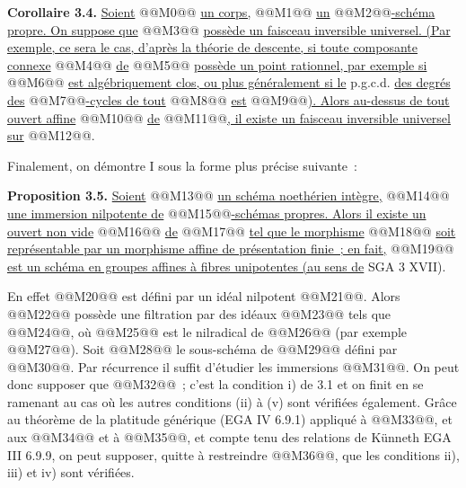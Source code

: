 
\textbf{Corollaire 3.4.} \uline{Soient} @@M0@@ \uline{un corps,} @@M1@@ \uline{un} @@M2@@\uline{-schéma propre. On suppose que} @@M3@@ \uline{possède un faisceau inversible universel. (Par exemple, ce sera le cas, d'après la théorie de descente, si toute composante connexe} @@M4@@ \uline{de} @@M5@@ \uline{possède un point rationnel, par exemple si} @@M6@@ \uline{est algébriquement clos, ou plus généralement si le} p.g.c.d. \uline{des degrés des} @@M7@@\uline{-cycles de tout} @@M8@@ \uline{est} @@M9@@\uline{). Alors au-dessus de tout ouvert affine} @@M10@@ \uline{de} @@M11@@\uline{, il existe un faisceau inversible universel sur} @@M12@@.

Finalement, on démontre I sous la forme plus précise suivante~:

\textbf{Proposition 3.5.} \uline{Soient} @@M13@@ \uline{un schéma noethérien intègre,} @@M14@@ \uline{une immersion nilpotente de} @@M15@@\uline{-schémas propres. Alors il existe un ouvert non vide} @@M16@@ \uline{de} @@M17@@ \uline{tel que le morphisme}
@@M18@@
\uline{soit représentable par un morphisme affine de présentation finie~; en fait,} @@M19@@ \uline{est un schéma en groupes affines à fibres unipotentes (au sens de} SGA 3 XVII).

En effet @@M20@@ est défini par un idéal nilpotent @@M21@@. Alors @@M22@@ possède une filtration par des idéaux @@M23@@ tels que @@M24@@, où @@M25@@ est le nilradical de @@M26@@ (par exemple @@M27@@). Soit @@M28@@ le sous-schéma de @@M29@@ défini par @@M30@@. Par récurrence il suffit d'étudier les immersions @@M31@@. On peut donc supposer que @@M32@@~; c'est la condition i) de 3.1 et on finit en se ramenant au cas où les autres conditions (ii) à (v) sont vérifiées également. Grâce au théorème de la platitude générique (EGA IV 6.9.1) appliqué à @@M33@@, et aux @@M34@@ et à @@M35@@, et compte tenu des relations de Künneth EGA III 6.9.9, on peut supposer, quitte à restreindre @@M36@@, que les conditions ii), iii) et iv) sont vérifiées.

